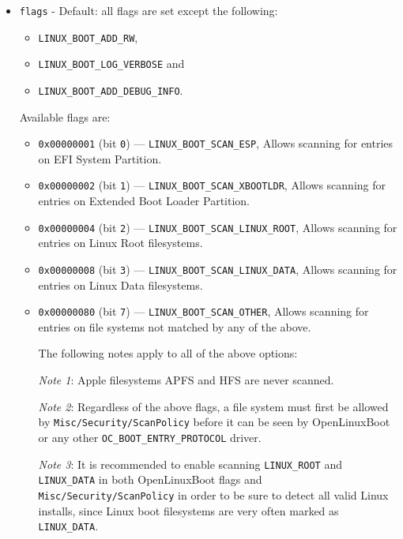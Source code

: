 \documentclass[]{article}
\providecommand{\tightlist}{%
  \setlength{\itemsep}{0pt}\setlength{\parskip}{0pt}}
\begin{document}
\begin{itemize}
\tightlist
	\item \texttt{flags} - Default: all flags are set except the following:
  \begin{itemize}
  \tightlist
    \item \texttt{LINUX\_BOOT\_ADD\_RW},
    \item \texttt{LINUX\_BOOT\_LOG\_VERBOSE} and
    \item \texttt{LINUX\_BOOT\_ADD\_DEBUG\_INFO}.
  \end{itemize}
  \medskip

	Available flags are: \medskip

  \begin{itemize}
  \tightlist
    \item \texttt{0x00000001} (bit \texttt{0}) --- \texttt{LINUX\_BOOT\_SCAN\_ESP},
    Allows scanning for entries on EFI System Partition.
    \item \texttt{0x00000002} (bit \texttt{1}) --- \texttt{LINUX\_BOOT\_SCAN\_XBOOTLDR},
    Allows scanning for entries on Extended Boot Loader Partition.
	  \item \texttt{0x00000004} (bit \texttt{2}) --- \texttt{LINUX\_BOOT\_SCAN\_LINUX\_ROOT},
	  Allows scanning for entries on Linux Root filesystems.
	  \item \texttt{0x00000008} (bit \texttt{3}) --- \texttt{LINUX\_BOOT\_SCAN\_LINUX\_DATA},
	  Allows scanning for entries on Linux Data filesystems.
	  \item \texttt{0x00000080} (bit \texttt{7}) --- \texttt{LINUX\_BOOT\_SCAN\_OTHER},
	  Allows scanning for entries on file systems not matched by any of the above. \medskip

	  The following notes apply to all of the above options: \medskip

	  \emph{Note 1}: Apple filesystems APFS and HFS are never scanned.
    \medskip

	  \emph{Note 2}: Regardless of the above flags, a file system must first be
	  allowed by \texttt{Misc/Security/ScanPolicy} before it can be seen by
    OpenLinuxBoot or any other \texttt{OC\_BOOT\_ENTRY\_PROTOCOL} driver.
    \medskip

	  \emph{Note 3}: It is recommended to enable scanning \texttt{LINUX\_ROOT} and \texttt{LINUX\_DATA}
    in both OpenLinuxBoot flags and \texttt{Misc/Security/ScanPolicy} in order to be sure to detect
    all valid Linux installs, since Linux boot filesystems are very often marked as \texttt{LINUX\_DATA}.
    \medskip


\end{itemize}
\end{itemize}
\end{document}
